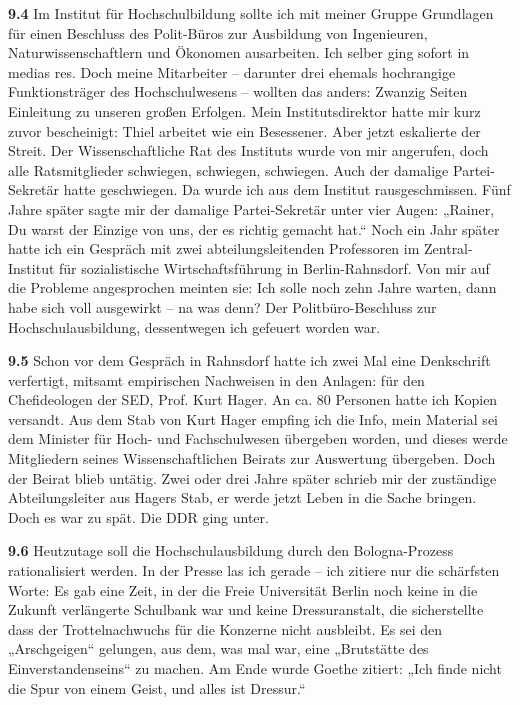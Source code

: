 \documentclass[12pt,a4paper]{article}
\begin{document}
\textbf{9.4} Im Institut für Hochschulbildung sollte ich mit meiner Gruppe
Grundlagen für einen Beschluss des Polit-Büros zur Ausbildung von Ingenieuren,
Naturwissenschaftlern und Ökonomen ausarbeiten. Ich selber ging sofort in
medias res. Doch meine Mitarbeiter – darunter drei ehemals hochrangige
Funktionsträger des Hochschulwesens – wollten das anders: Zwanzig Seiten
Einleitung zu unseren großen Erfolgen. Mein Institutsdirektor hatte mir kurz
zuvor bescheinigt: Thiel arbeitet wie ein Besessener. Aber jetzt eskalierte der
Streit. Der Wissenschaftliche Rat des Instituts wurde von mir angerufen, doch
alle Ratsmitglieder schwiegen, schwiegen, schwiegen. Auch der damalige
Partei-Sekretär hatte geschwiegen. Da wurde ich aus dem Institut
rausgeschmissen. Fünf Jahre später sagte mir der damalige Partei-Sekretär unter
vier Augen: „Rainer, Du warst der Einzige von uns, der es richtig gemacht hat.“
Noch ein Jahr später hatte ich ein Gespräch mit zwei abteilungsleitenden
Professoren im Zentral-Institut für sozialistische Wirtschaftsführung in
Berlin-Rahnsdorf. Von mir auf die Probleme angesprochen meinten sie: Ich solle
noch zehn Jahre warten, dann habe sich voll ausgewirkt – na was denn? Der
Politbüro-Beschluss zur Hochschulausbildung, dessentwegen ich gefeuert worden
war.

\textbf{9.5} Schon vor dem Gespräch in Rahnsdorf hatte ich zwei Mal eine
Denkschrift verfertigt, mitsamt empirischen Nachweisen in den Anlagen: für den
Chefideologen der SED, Prof. Kurt Hager. An ca. 80 Personen hatte ich Kopien
versandt. Aus dem Stab von Kurt Hager empfing ich die Info, mein Material sei
dem Minister für Hoch- und Fachschulwesen übergeben worden, und dieses werde
Mitgliedern seines Wissenschaftlichen Beirats zur Auswertung übergeben. Doch
der Beirat blieb untätig. Zwei oder drei Jahre später schrieb mir der
zuständige Abteilungsleiter aus Hagers Stab, er werde jetzt Leben in die Sache
bringen. Doch es war zu spät. Die DDR ging unter.

\textbf{9.6} Heutzutage soll die Hochschulausbildung durch den Bologna-Prozess
rationalisiert werden. In der Presse las ich gerade – ich zitiere nur die
schärfsten Worte: Es gab eine Zeit, in der die Freie Universität Berlin noch
keine in die Zukunft verlängerte Schulbank war und keine Dressuranstalt, die
sicherstellte dass der Trottelnachwuchs für die Konzerne nicht ausbleibt. Es
sei den „Arschgeigen“ gelungen, aus dem, was mal war, eine „Brutstätte des
Einverstandenseins“ zu machen. Am Ende wurde Goethe zitiert: „Ich finde nicht
die Spur von einem Geist, und alles ist Dressur.“
\end{document}
